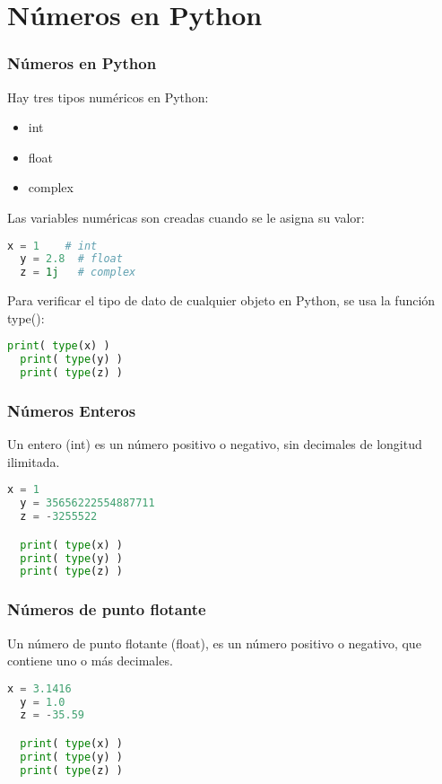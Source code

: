 \section{Números en Python}

\begin{frame}[fragile]
  \frametitle{Números en Python}

  \vspace{\baselineskip}
  Hay tres tipos numéricos en Python:

  \begin{itemize}
    \item \textcolor{codeKeyword2}{int}
    \item \textcolor{codeKeyword2}{float}
    \item \textcolor{codeKeyword2}{complex}
  \end{itemize}

  Las variables numéricas son creadas cuando se le asigna su valor:

  \begin{lstlisting}[language=Python]
  x = 1    # int
  y = 2.8  # float
  z = 1j   # complex
  \end{lstlisting}

  \pausa
  Para verificar el tipo de dato de cualquier objeto en Python, se usa la
  función \textcolor{codeKeyword2}{type}():

  \begin{lstlisting}[language=Python]
  print( type(x) )
  print( type(y) )
  print( type(z) )
  \end{lstlisting}
\end{frame}

\begin{frame}[fragile]
  \frametitle{Números Enteros}

  Un entero (\textcolor{codeKeyword2}{int}) es un número positivo o
  negativo, sin decimales de longitud ilimitada.

  \vspace{\baselineskip}
  \begin{lstlisting}[language=Python]
  x = 1
  y = 35656222554887711
  z = -3255522

  print( type(x) )
  print( type(y) )
  print( type(z) )
  \end{lstlisting}
\end{frame}

\begin{frame}[fragile]
  \frametitle{Números de punto flotante}

  Un número de punto flotante (\textcolor{codeKeyword2}{float}), es un número
  positivo o negativo, que contiene uno o más decimales.

  \vspace{\baselineskip}
  \begin{lstlisting}[language=Python]
  x = 3.1416
  y = 1.0
  z = -35.59

  print( type(x) )
  print( type(y) )
  print( type(z) )
  \end{lstlisting}
\end{frame}

